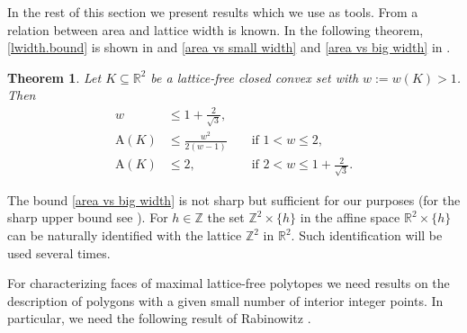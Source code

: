 \documentclass[a4paper]{article}
\theoremstyle{plain}
\newtheorem{theorem}[nn]{Theorem}
\begin{document}
In the rest of this section we present results which we  use as tools. 
From \cite{AverkovWagner,Hurkens90} a relation between area
and lattice width is known.
In the following theorem, \eqref{lwidth.bound} is shown in
\cite{Hurkens90} and \eqref{area vs small width} and
\eqref{area vs big width} in \cite{AverkovWagner}.

\begin{theorem} \label{area,width}
Let $K \subseteq {\mathbb{R}}^2$ be a lattice-free closed convex set
with $w := w(K) > 1$.
Then
\begin{align}
  w   & \le 1+\frac{2}{\sqrt{3}}, & & \label{lwidth.bound} \\
  {\mathrm{A}}(K) & \le \frac{w^2}{2(w-1)} & &
             \mbox{ if } 1 < w \le 2, \label{area vs small width} \\
  {\mathrm{A}}(K) & \le 2, & & \mbox{ if } 2 < w \le
             1+\frac{2}{\sqrt{3}}. \label{area vs big width}
\end{align}
\end{theorem}

The bound \eqref{area vs big width} is not sharp but
sufficient for our purposes (for the sharp upper bound see
\cite[Theorem\,2.2]{AverkovWagner}).
For $h \in {\mathbb{Z}}$ the set ${\mathbb{Z}}^2 \times \{h\}$ in the affine
space ${\mathbb{R}}^2 \times \{h\}$ can be naturally identified with
the lattice ${\mathbb{Z}}^2$ in ${\mathbb{R}}^2$.
Such identification will be used several times.

For characterizing faces of maximal lattice-free polytopes we need results on the description of polygons with a given small number of interior integer points. In particular, 
we need the following result of Rabinowitz
\cite{Rabinowitz89}. 
\end{document}
